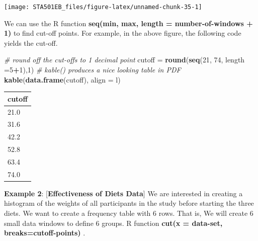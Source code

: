 \documentclass[
]{book}
\newenvironment{Shaded}{\begin{snugshade}}{\end{snugshade}}
\newcommand{\AttributeTok}[1]{\textcolor[rgb]{0.13,0.29,0.53}{#1}}
\newcommand{\CommentTok}[1]{\textcolor[rgb]{0.56,0.35,0.01}{\textit{#1}}}
\newcommand{\DecValTok}[1]{\textcolor[rgb]{0.00,0.00,0.81}{#1}}
\newcommand{\FunctionTok}[1]{\textcolor[rgb]{0.13,0.29,0.53}{\textbf{#1}}}
\newcommand{\NormalTok}[1]{#1}
\newcommand{\OtherTok}[1]{\textcolor[rgb]{0.56,0.35,0.01}{#1}}
\newcommand{\SpecialCharTok}[1]{\textcolor[rgb]{0.81,0.36,0.00}{\textbf{#1}}}
\newcommand{\StringTok}[1]{\textcolor[rgb]{0.31,0.60,0.02}{#1}}
\begin{document}
\begin{center}\texttt{[image: STA501EB\_files/figure-latex/unnamed-chunk-35-1]} \end{center}

We can use the R function \textbf{seq(min, max, length = number-of-windows + 1)} to find cut-off points. For example, in the above figure, the following code yields the cut-off.

\begin{Shaded}
\begin{Highlighting}[]
\CommentTok{\# round off the cut{-}offs to 1 decimal point}
\NormalTok{cutoff }\OtherTok{=} \FunctionTok{round}\NormalTok{(}\FunctionTok{seq}\NormalTok{(}\DecValTok{21}\NormalTok{, }\DecValTok{74}\NormalTok{, }\AttributeTok{length =}\DecValTok{5}\SpecialCharTok{+}\DecValTok{1}\NormalTok{),}\DecValTok{1}\NormalTok{)}
\CommentTok{\# kable() produces a nice looking table in PDF }
\FunctionTok{kable}\NormalTok{(}\FunctionTok{data.frame}\NormalTok{(cutoff), }\AttributeTok{align =} \StringTok{\textquotesingle{}l\textquotesingle{}}\NormalTok{)                         }
\end{Highlighting}
\end{Shaded}

\begin{tabular}{l}
\hline
cutoff\\
\hline
21.0\\
\hline
31.6\\
\hline
42.2\\
\hline
52.8\\
\hline
63.4\\
\hline
74.0\\
\hline
\end{tabular}

\textbf{Example 2}: {[}\textbf{Effectiveness of Diets Data}{]} We are interested in creating a histogram of the weights of all participants in the study before starting the three diets. We want to create a frequency table with 6 rows. That is, We will create 6 small data windows to define 6 groups. R function \textbf{cut(x = data-set, breaks=cutoff-points)} .
\end{document}
